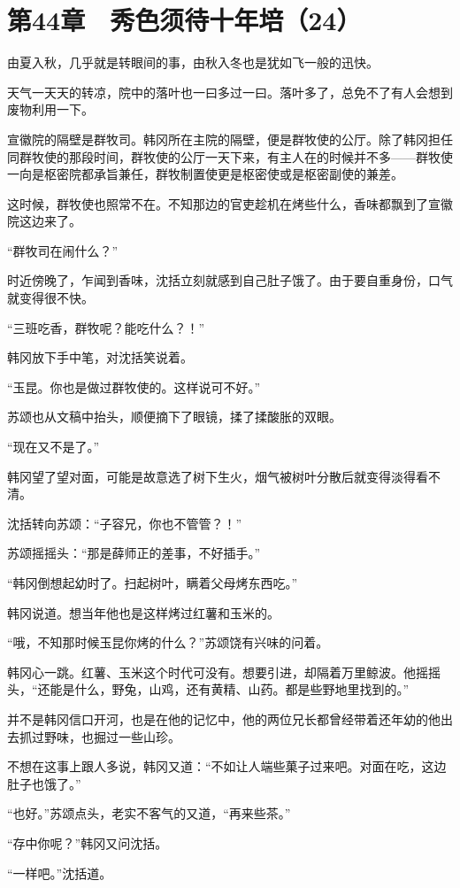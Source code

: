 \section{第44章　秀色须待十年培（24）}

由夏入秋，几乎就是转眼间的事，由秋入冬也是犹如飞一般的迅快。

天气一天天的转凉，院中的落叶也一曰多过一曰。落叶多了，总免不了有人会想到废物利用一下。

宣徽院的隔壁是群牧司。韩冈所在主院的隔壁，便是群牧使的公厅。除了韩冈担任同群牧使的那段时间，群牧使的公厅一天下来，有主人在的时候并不多——群牧使一向是枢密院都承旨兼任，群牧制置使更是枢密使或是枢密副使的兼差。

这时候，群牧使也照常不在。不知那边的官吏趁机在烤些什么，香味都飘到了宣徽院这边来了。

“群牧司在闹什么？”

时近傍晚了，乍闻到香味，沈括立刻就感到自己肚子饿了。由于要自重身份，口气就变得很不快。

“三班吃香，群牧呢？能吃什么？！”

韩冈放下手中笔，对沈括笑说着。

“玉昆。你也是做过群牧使的。这样说可不好。”

苏颂也从文稿中抬头，顺便摘下了眼镜，揉了揉酸胀的双眼。

“现在又不是了。”

韩冈望了望对面，可能是故意选了树下生火，烟气被树叶分散后就变得淡得看不清。

沈括转向苏颂：“子容兄，你也不管管？！”

苏颂摇摇头：“那是薛师正的差事，不好插手。”

“韩冈倒想起幼时了。扫起树叶，瞒着父母烤东西吃。”

韩冈说道。想当年他也是这样烤过红薯和玉米的。

“哦，不知那时候玉昆你烤的什么？”苏颂饶有兴味的问着。

韩冈心一跳。红薯、玉米这个时代可没有。想要引进，却隔着万里鲸波。他摇摇头，“还能是什么，野兔，山鸡，还有黄精、山药。都是些野地里找到的。”

并不是韩冈信口开河，也是在他的记忆中，他的两位兄长都曾经带着还年幼的他出去抓过野味，也掘过一些山珍。

不想在这事上跟人多说，韩冈又道：“不如让人端些菓子过来吧。对面在吃，这边肚子也饿了。”

“也好。”苏颂点头，老实不客气的又道，“再来些茶。”

“存中你呢？”韩冈又问沈括。

“一样吧。”沈括道。

